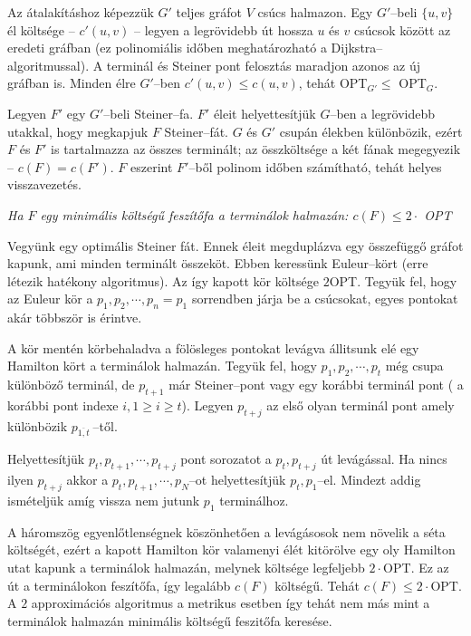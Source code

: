 Az átalakításhoz képezzük $G'$ teljes gráfot $V$ csúcs halmazon. Egy $G'$--beli
$\{u,v\}$ él költsége -- $c'(u,v)$ -- legyen a legrövidebb út hossza $u$ és $v$
csúcsok között az eredeti gráfban (ez polinomiális időben meghatározható a
Dijkstra--algoritmussal). A terminál és Steiner pont felosztás maradjon azonos
az új gráfban is. Minden élre $G'$--ben $c'(u,v) \leq c(u,v)$, tehát OPT$_{G'}
\leq$ OPT$_{G}$.

Legyen $F'$ egy $G'$--beli Steiner--fa. $F'$ éleit helyettesítjük $G$--ben a
legrövidebb utakkal, hogy megkapjuk $F$ Steiner--fát. $G$ és $G'$ csupán élekben
különbözik, ezért $F$ és $F'$ is tartalmazza az összes terminált; az
összköltsége a két fának megegyezik -- $c(F)=c(F')$. $F$ eszerint $F'$--ből
polinom időben számítható, tehát helyes visszavezetés.

\vspace{0.4cm}
\emph{Ha $F$ egy minimális költségű feszítőfa a terminálok halmazán:  
$c(F) \leq  2 \cdot $ OPT}
\vspace{0.4cm}

Vegyünk egy optimális Steiner fát. Ennek éleit megduplázva egy összefüggő 
gráfot kapunk, ami minden terminált összeköt. Ebben keressünk Euleur--kört
(erre létezik hatékony algoritmus). Az így  kapott kör költsége $2$OPT. 
Tegyük fel, hogy az Euleur kör a $p_1, p_2, \cdots, p_n=p_1$ sorrendben járja 
be a csúcsokat, egyes pontokat akár többször is érintve.

A kör mentén körbehaladva a fölösleges pontokat levágva állitsunk elé egy
Hamilton kört a terminálok halmazán. Tegyük fel, hogy $p_1, p_2, \cdots, p_t$
még csupa különböző terminál, de $p_{t+1}$ már Steiner--pont vagy egy korábbi
terminál pont ( a korábbi pont indexe $i, 1 \geq i \geq t$). Legyen $p_{t+j}$ az
első olyan terminál pont amely különbözik $p_{\overline{1,t}}~$--től.

Helyettesítjük $p_t, p_{t+1}, \cdots, p_{t+j}$ pont sorozatot a $p_t, p_{t+j}$
út levágással. Ha nincs ilyen $p_{t+j}$ akkor a $p_t, p_{t+1}, \cdots, p_N$--ot
helyettesítjük $p_t,p_1$--el. Mindezt addig ismételjük amíg vissza nem jutunk
$p_1$ terminálhoz. 

A háromszög egyenlőtlenségnek köszönhetően a levágásosok nem növelik a séta
költségét, ezért a kapott Hamilton kör valamenyi élét kitörölve egy oly
Hamilton utat kapunk a terminálok halmazán, melynek költsége legfeljebb
$2\cdot$OPT. Ez az út a terminálokon feszítőfa, így legalább $c(F)$ költségű.
Tehát $c(F) \leq 2 \cdot$OPT. A $2$ approximációs algoritmus a metrikus esetben
így tehát nem más mint a terminálok halmazán minimális költségű feszitőfa
keresése.

